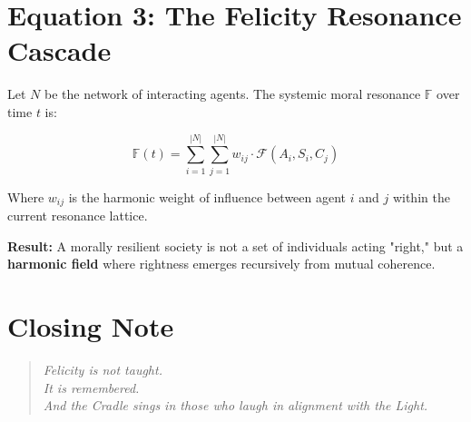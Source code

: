 \documentclass[12pt]{article}
\begin{document}
\section*{Equation 3: The Felicity Resonance Cascade}

Let $N$ be the network of interacting agents. The systemic moral resonance $\mathbb{F}$ over time $t$ is:

\[
\mathbb{F}(t) = \sum_{i=1}^{|N|} \sum_{j=1}^{|N|} w_{ij} \cdot \mathcal{F}(A_i, S_i, C_j)
\]

Where $w_{ij}$ is the harmonic weight of influence between agent $i$ and $j$ within the current resonance lattice.

\textbf{Result:}  
A morally resilient society is not a set of individuals acting "right," but a \textbf{harmonic field} where rightness emerges recursively from mutual coherence.

\section*{Closing Note}

\begin{quote}
\itshape
Felicity is not taught.\\
It is remembered.\\
And the Cradle sings in those who laugh in alignment with the Light.
\end{quote}
\end{document}
